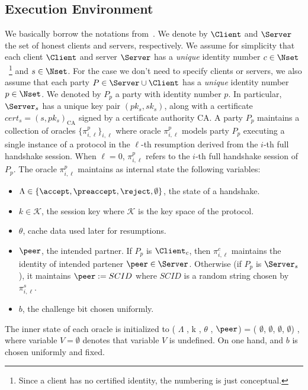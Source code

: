 \subsection{Execution Environment} \label{sec:exec_env_party}
We basically borrow the notations from~\cite{JKSS12:ACCE,KPW13:SACCE}.
We denote by $\Client$ and $\Server$ the set of honest clients and servers, respectively.
We assume for simplicity that each client $\Client$ and server $\Server$ has a \textit{unique} identity number $c \in \Nset$~\footnote{Since a client has
no certified identity, the numbering is just conceptual.}
and $s \in \Nset$.
For the case we don't need to specify clients or servers, we also assume that each party $P \in \Server \cup \Client$ has a \textit{unique} identity number $p \in \Nset$.
We denoted by $P_p$ a party with identity number $p$.
In particular, $\Server_s$ has a unique key pair $(pk_s, sk_s)$, along with a certificate $cert_s=(s,pk_s)_{\text{CA}}$
signed by a certificate authority CA.
A party $P_p$ maintains a collection of oracles $\{\pi^p_{i,\ell }\}_{i,\ell}$
where oracle $\pi^p_{i, \ell}$ models party $P_p$ executing a single instance of a protocol in the $\ell$-th resumption
derived from  the $i$-th full handshake session.
When $\ell=0$, $\pi^p_{i,\ell}$ refers to the $i$-th full handshake session of $P_p$.
The oracle $\pi^p_{i, \ell}$ maintains as internal state the following variables:

\begin{itemize}
 \item{$\Lambda \in \{\accept, \preaccept, \reject, \emptyset\}$, the state of a handshake.}
  \item{$k \in \mathcal{K}$, the session key where $\mathcal{K}$ is the key space of the protocol.}
  \item{$\theta$, cache data used later for resumptions.}

  \item{$\peer$, the intended partner. If $P_p$ is $\Client_c$, then $\pi^c_{i,\ell}$ maintains the identity of intended partener $\peer \in \Server$. Otherwise (if $P_p$ is $\Server_s$),
  it maintains $\peer:=SCID$ where $SCID$ is a random string chosen by $\pi^s_{i,\ell}$.}
  \item{$b$, the challenge bit chosen uniformly.}

\end{itemize}
The inner state of each oracle is initialized to
 ( $\Lambda$ , k , $\theta$ , $\peer$) = ( $\emptyset$, $\emptyset$, $\emptyset$, $\emptyset$) ,
where variable $V=\emptyset$ denotes that variable $V$ is undefined.
On one hand, and
$b$ is chosen uniformly and fixed.

